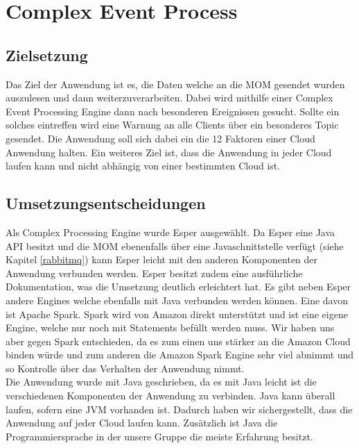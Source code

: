 \section{Complex Event Process}\label{cep}


\subsection{Zielsetzung}
Das Ziel der Anwendung ist es, die Daten welche an die MOM gesendet wurden auszulesen und dann weiterzuverarbeiten. Dabei wird mithilfe einer Complex Event Processing Engine dann nach besonderen Ereignissen gesucht. Sollte ein solches eintreffen wird eine Warnung an alle Clients über ein besonderes Topic gesendet. Die Anwendung soll sich dabei ein die 12 Faktoren einer Cloud Anwendung halten. Ein weiteres Ziel ist, dass die Anwendung in jeder Cloud laufen kann und nicht abhängig von einer bestimmten Cloud ist. 

\subsection{Umsetzungsentscheidungen}
Als Complex Processing Engine wurde Esper ausgewählt. Da Esper eine Java API besitzt und die MOM ebenenfalls über eine Javaschnittstelle verfügt (siehe Kapitel \ref{rabbitmq}) kann Esper leicht mit den anderen Komponenten der Anwendung verbunden werden. Esper besitzt zudem eine ausführliche Dokumentation, was die Umsetzung deutlich erleichtert hat. Es gibt neben Esper andere Engines welche ebenfalls mit Java verbunden werden können. Eine davon ist Apache Spark. Spark wird von Amazon direkt unterstützt und ist eine eigene Engine, welche nur noch mit Statements befüllt werden muss. Wir haben uns aber gegen Spark entschieden, da es zum einen uns stärker an die Amazon Cloud binden würde und zum anderen die Amazon Spark Engine sehr viel abnimmt und so Kontrolle über das Verhalten der Anwendung nimmt. 
\\
Die Anwendung wurde mit Java geschrieben, da es mit Java leicht ist die verschiedenen Komponenten der Anwendung zu verbinden. Java kann überall laufen, sofern eine JVM vorhanden ist. Dadurch haben wir sichergestellt, dass die Anwendung auf jeder Cloud laufen kann. Zusätzlich ist Java die Programmiersprache in der unsere Gruppe die meiste Erfahrung besitzt.   

